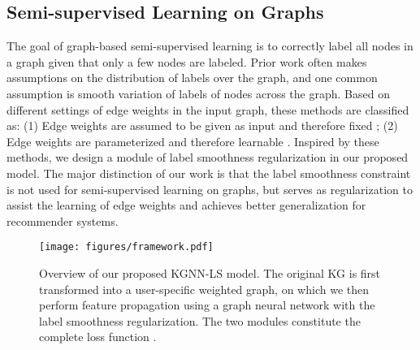 \documentclass[sigconf]{acmart}
\begin{document}
		
	\subsection{Semi-supervised Learning on Graphs}
		The goal of graph-based semi-supervised learning is to correctly label all nodes in a graph given that only a few nodes are labeled.
		Prior work often makes assumptions on the distribution of labels over the graph, and one common assumption is smooth variation of labels of nodes across the graph.
		Based on different settings of edge weights in the input graph, these methods are classified as:
		(1) Edge weights are assumed to be given as input and therefore fixed \cite{zhu2003semi,zhou2004learning,baluja2008video};
(2) Edge weights are parameterized and therefore learnable \cite{zhang2007hyperparameter,wang2008label,karasuyama2013manifold}.
		Inspired by these methods, we design a module of label smoothness regularization in our proposed model.
		The major distinction of our work is that the label smoothness constraint is not used for semi-supervised learning on graphs, but serves as regularization to assist the learning of edge weights and achieves better generalization for recommender systems.
		
	\begin{figure*}[t]
		\centering
		\texttt{[image: figures/framework.pdf]}
		\caption{Overview of our proposed KGNN-LS model. The original KG is first transformed into a user-specific weighted graph, on which we then perform feature propagation using a graph neural network with the label smoothness regularization. The two modules constitute the complete loss function .}
		\label{fig:framework}
	\end{figure*}
		
		
\end{document}
